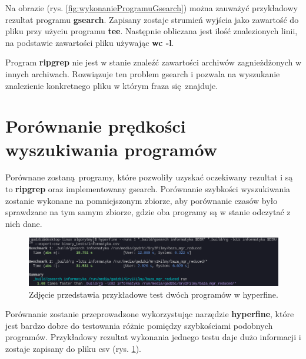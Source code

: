 Na obrazie (rys. \ref{fig:wykonanieProgramuGsearch}) można zauważyć przykładowy
rezultat programu \textbf{gsearch}. Zapisany zostaje strumień wyjścia jako zawartość do pliku
przy użyciu programu \textbf{tee}. Następnie obliczana jest ilość znalezionych linii,
na podstawie zawartości pliku używając \textbf{wc -l}.

Program \textbf{ripgrep} nie jest w stanie znaleźć zawartości archiwów zagnieżdżonych w
innych archiwach. Rozwiązuje ten problem gsearch i pozwala na wyszukanie 
znalezienie konkretnego pliku w którym fraza się znajduje.

\section{Porównanie prędkości wyszukiwania programów}

Porównane zostaną programy, które pozwoliły uzyskać oczekiwany rezultat i są to
\textbf{ripgrep} oraz implementowany gsearch. 
Porównanie szybkości wyszukiwania zostanie wykonane na pomniejszonym zbiorze,
aby porównanie czasów było sprawdzane na tym samym zbiorze, gdzie oba programy
są w stanie odczytać z nich dane.

\begin{figure}[htbp]
    \centering
    \includegraphics[width=\textwidth]{./images/example-hyperfine-run.png}
    \caption{Zdjęcie przedstawia przykładowe test dwóch programów w hyperfine.}
    \label{fig:hyperfineExample}
\end{figure}

Porównanie zostanie przeprowadzone wykorzystując narzędzie \textbf{hyperfine}, które
jest bardzo dobre do testowania różnic pomiędzy szybkościami podobnych programów.
Przykładowy rezultat wykonania jednego testu daje dużo informacji i zostaje
zapisany do pliku csv (rys. \ref{fig:hyperfineExample}).

